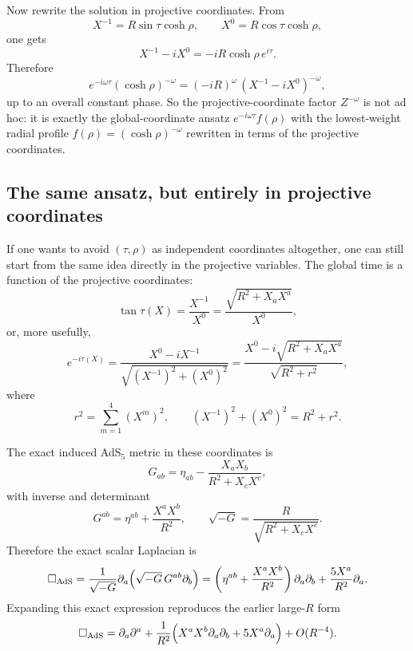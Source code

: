 \documentclass[12pt]{article}
\begin{document}
Now rewrite the solution in projective coordinates.  From
\begin{equation}
X^{-1}=R\sin\tau\cosh\rho,\qquad X^0=R\cos\tau\cosh\rho,
\end{equation}
one gets
\begin{equation}
X^{-1}-iX^0=-iR\cosh\rho\,e^{i\tau}.
\end{equation}
Therefore
\begin{equation}
e^{-i\omega\tau}(\cosh\rho)^{-\omega}
=
(-iR)^\omega\,(X^{-1}-iX^0)^{-\omega},
\end{equation}
up to an overall constant phase.  So the projective-coordinate factor $Z^{-\omega}$ is not ad hoc:
it is exactly the global-coordinate ansatz $e^{-i\omega\tau}f(\rho)$ with the lowest-weight radial
profile $f(\rho)=(\cosh\rho)^{-\omega}$ rewritten in terms of the projective coordinates.

\subsection*{The same ansatz, but entirely in projective coordinates}

If one wants to avoid $(\tau,\rho)$ as independent coordinates altogether, one can still start from the
same idea directly in the projective variables.  The global time is a function of the projective
coordinates:
\begin{equation}
\tan\tau(X)=\frac{X^{-1}}{X^0}
=
\frac{\sqrt{R^2+X_aX^a}}{X^0},
\end{equation}
or, more usefully,
\begin{equation}
e^{-i\tau(X)}=\frac{X^0-iX^{-1}}{\sqrt{(X^{-1})^2+(X^0)^2}}
=
\frac{X^0-i\sqrt{R^2+X_aX^a}}{\sqrt{R^2+r^2}},
\end{equation}
where
\begin{equation}
r^2=\sum_{m=1}^4 (X^m)^2,
\qquad
(X^{-1})^2+(X^0)^2=R^2+r^2.
\end{equation}

The exact induced AdS$_5$ metric in these coordinates is
\begin{equation}
G_{ab}=\eta_{ab}-\frac{X_aX_b}{R^2+X_cX^c},
\end{equation}
with inverse and determinant
\begin{equation}
G^{ab}=\eta^{ab}+\frac{X^aX^b}{R^2},
\qquad
\sqrt{-G}=\frac{R}{\sqrt{R^2+X_cX^c}}.
\end{equation}
Therefore the exact scalar Laplacian is
\begin{equation}
\Box_{\rm AdS}
=
\frac{1}{\sqrt{-G}}\partial_a\!\left(\sqrt{-G}\,G^{ab}\partial_b\right)
=
\left(\eta^{ab}+\frac{X^aX^b}{R^2}\right)\partial_a\partial_b
+\frac{5X^a}{R^2}\partial_a .
\end{equation}
Expanding this exact expression reproduces the earlier large-$R$ form
\[
\Box_{\rm AdS}
=
\partial_a\partial^a
+\frac{1}{R^2}\Big(X^aX^b\partial_a\partial_b+5X^a\partial_a\Big)
+O(R^{-4}).
\]
\end{document}
